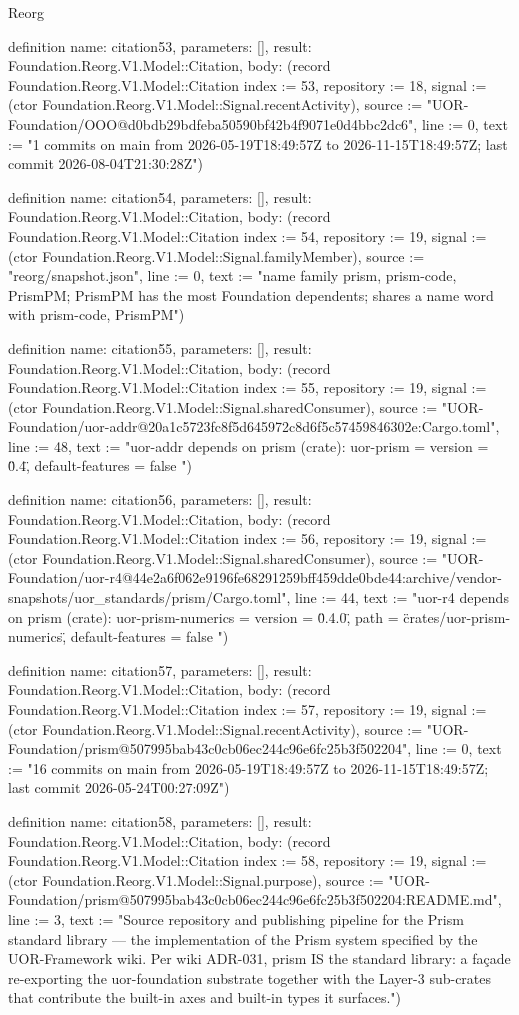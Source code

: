 \begin{lexlean}{Reorg}
\begin{semanticmodule}
definition{
  name: citation53,
  parameters: [],
  result: Foundation.Reorg.V1.Model::Citation,
  body: (record Foundation.Reorg.V1.Model::Citation {index := 53, repository := 18, signal := (ctor Foundation.Reorg.V1.Model::Signal.recentActivity), source := "UOR-Foundation/OOO@d0bdb29bdfeba50590bf42b4f9071e0d4bbc2dc6", line := 0, text := "1 commits on main from 2026-05-19T18:49:57Z to 2026-11-15T18:49:57Z; last commit 2026-08-04T21:30:28Z"})
}

definition{
  name: citation54,
  parameters: [],
  result: Foundation.Reorg.V1.Model::Citation,
  body: (record Foundation.Reorg.V1.Model::Citation {index := 54, repository := 19, signal := (ctor Foundation.Reorg.V1.Model::Signal.familyMember), source := "reorg/snapshot.json", line := 0, text := "name family {prism, prism-code, PrismPM}; PrismPM has the most Foundation dependents; shares a name word with prism-code, PrismPM"})
}

definition{
  name: citation55,
  parameters: [],
  result: Foundation.Reorg.V1.Model::Citation,
  body: (record Foundation.Reorg.V1.Model::Citation {index := 55, repository := 19, signal := (ctor Foundation.Reorg.V1.Model::Signal.sharedConsumer), source := "UOR-Foundation/uor-addr@20a1c5723fc8f5d645972c8d6f5c57459846302e:Cargo.toml", line := 48, text := "uor-addr depends on prism (crate): uor-prism          = { version = \"0.4\", default-features = false }"})
}

definition{
  name: citation56,
  parameters: [],
  result: Foundation.Reorg.V1.Model::Citation,
  body: (record Foundation.Reorg.V1.Model::Citation {index := 56, repository := 19, signal := (ctor Foundation.Reorg.V1.Model::Signal.sharedConsumer), source := "UOR-Foundation/uor-r4@44e2a6f062e9196fe68291259bff459dde0bde44:archive/vendor-snapshots/uor_standards/prism/Cargo.toml", line := 44, text := "uor-r4 depends on prism (crate): uor-prism-numerics = { version = \"0.4.0\", path = \"crates/uor-prism-numerics\", default-features = false }"})
}

definition{
  name: citation57,
  parameters: [],
  result: Foundation.Reorg.V1.Model::Citation,
  body: (record Foundation.Reorg.V1.Model::Citation {index := 57, repository := 19, signal := (ctor Foundation.Reorg.V1.Model::Signal.recentActivity), source := "UOR-Foundation/prism@507995bab43c0cb06ec244c96e6fc25b3f502204", line := 0, text := "16 commits on main from 2026-05-19T18:49:57Z to 2026-11-15T18:49:57Z; last commit 2026-05-24T00:27:09Z"})
}

definition{
  name: citation58,
  parameters: [],
  result: Foundation.Reorg.V1.Model::Citation,
  body: (record Foundation.Reorg.V1.Model::Citation {index := 58, repository := 19, signal := (ctor Foundation.Reorg.V1.Model::Signal.purpose), source := "UOR-Foundation/prism@507995bab43c0cb06ec244c96e6fc25b3f502204:README.md", line := 3, text := "Source repository and publishing pipeline for the Prism standard library — the implementation of the Prism system specified by the UOR-Framework wiki. Per wiki ADR-031, prism IS the standard library: a façade re-exporting the uor-foundation substrate together with the Layer-3 sub-crates that contribute the built-in axes and built-in types it surfaces."})
}


\end{semanticmodule}
\end{lexlean}
